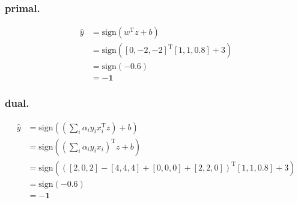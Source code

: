 \documentclass[12pt]{article}
\begin{document}
	\subsubsection*{primal.}
	\begin{align}
		\hat{y} &= \textrm{sign}\left(w^\textrm{T}z+b\right) \\
				&= \textrm{sign}\left(\left[0,-2,-2\right]^\textrm{T}\left[1,1,0.8\right]+3\right) \\
				&= \textrm{sign}\left(-0.6\right) \\
				&= \mathbf{-1}
	\end{align}

	\subsubsection*{dual.}
	\begin{align}
		\hat{y} &= \textrm{sign}\left(\left(\sum_i \alpha_i y_i x_i^\textrm{T}z \right) + b\right) \\
		&= \textrm{sign}\left(\left(\sum_i \alpha_i y_i x_i \right)^\textrm{T}z+b\right) \\
		&= \textrm{sign}\left(\left(\left[2,0,2\right]-\left[4,4,4\right]+\left[0,0,0\right]+\left[2,2,0\right]\right)^\textrm{T}\left[1,1,0.8\right]+3\right) \\
		&= \textrm{sign}\left(-0.6\right) \\
		&= \mathbf{-1}
	\end{align}
\end{document}
